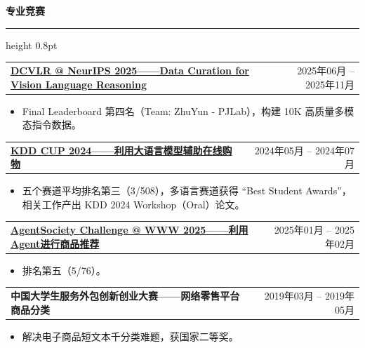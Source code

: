 \documentclass[UTF8]{ctexart}
\makeatletter
\newcommand{\cvsection}[1]{%
  \vspace{0.35em}
  {\zihao{-3}\bfseries #1\par}
  \vspace{0.1em}
  {\color{cvrule}\hrule height 0.8pt}
  \vspace{0.36em}
}
\newcommand{\cventryone}[2]{%
  \begin{tabularx}{\textwidth}{@{}Xr@{}}
    \textbf{#1} & #2
  \end{tabularx}\par
}
\makeatother
\begin{document}
\cvsection{专业竞赛}
\cventryone{\href{https://dcvlr-neurips.github.io/}{DCVLR @ NeurIPS 2025——Data Curation for Vision Language Reasoning}}{2025年06月 -- 2025年11月}
\begin{itemize}
  \item Final Leaderboard 第四名（Team: ZhuYun - PJLab），构建 10K 高质量多模态指令数据。
\end{itemize}
\vspace{-0.2em}
\cventryone{\href{https://www.aicrowd.com/challenges/amazon-kdd-cup-2024-multi-task-online-shopping-challenge-for-llms}{KDD CUP 2024——利用大语言模型辅助在线购物}}{2024年05月 -- 2024年07月}
\begin{itemize}
  \item 五个赛道平均排名第三（3/508），多语言赛道获得 ``Best Student Awards''，相关工作产出 KDD 2024 Workshop（Oral）论文。
\end{itemize}
\vspace{-0.2em}
\cventryone{\href{https://tsinghua-fib-lab.github.io/AgentSocietyChallenge/pages/overview.html}{AgentSociety Challenge @ WWW 2025——利用Agent进行商品推荐}}{2025年01月 -- 2025年02月}
\begin{itemize}
  \item 排名第五（5/76）。
\end{itemize}
\vspace{-0.2em}
\cventryone{中国大学生服务外包创新创业大赛——网络零售平台商品分类}{2019年03月 -- 2019年05月}
\begin{itemize}
  \item 解决电子商品短文本千分类难题，获国家二等奖。
\end{itemize}
\end{document}
